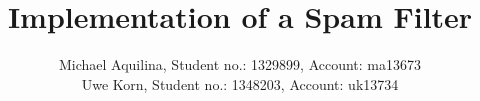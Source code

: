 \documentclass[12pt,journal]{IEEEtran}
\begin{document}
\newcommand{\todo}[1]{{\color{red} #1}}

\title{Implementation of a Spam Filter}
\author{Michael Aquilina, Student no.: 1329899, Account: ma13673 \\
    Uwe Korn, Student no.: 1348203, Account: uk13734}
\maketitle
\IEEEpeerreviewmaketitle















\end{document}
